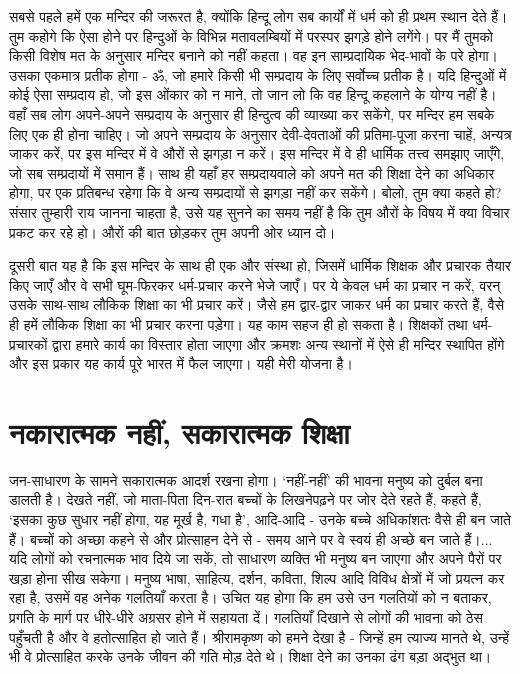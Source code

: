 
सबसे पहले हमें एक मन्दिर की जरूरत है, क्योंकि हिन्दू लोग सब कार्यों में धर्म को ही प्रथम स्थान देते हैं। तुम कहोगे कि ऐसा होने पर हिन्दुओं के विभिन्न मतावलम्बियों में परस्पर झगड़े होने लगेंगे। पर मैं तुमको किसी विशेष मत के अनुसार मन्दिर बनाने को नहीं कहता। वह इन साम्प्रदायिक भेद-भावों के परे होगा। उसका एकमात्र प्रतीक होगा - ॐ, जो हमारे किसी भी सम्प्रदाय के लिए सर्वोच्च प्रतीक है। यदि हिन्दुओं में कोई ऐसा सम्प्रदाय हो, जो इस ओंकार को न माने, तो जान लो कि वह हिन्दू कहलाने के योग्य नहीं है। वहाँ सब लोग अपने-अपने सम्प्रदाय के अनुसार ही हिन्दुत्व की व्याख्या कर सकेंगे, पर मन्दिर हम सबके लिए एक ही होना चाहिए। जो अपने सम्प्रदाय के अनुसार देवी-देवताओं की प्रतिमा-पूजा करना चाहें, अन्यत्र जाकर करें, पर इस मन्दिर में वे औरों से झगड़ा न करें। इस मन्दिर में वे ही धार्मिक तत्त्व समझाए जाएँगे, जो सब सम्प्रदायों में समान हैं। साथ ही यहाँ हर सम्प्रदायवाले को अपने मत की शिक्षा देने का अधिकार होगा, पर एक प्रतिबन्ध रहेगा कि वे अन्य सम्प्रदायों से झगड़ा नहीं कर सकेंगे। बोलो, तुम क्या कहते हो? संसार तुम्हारी राय जानना चाहता है, उसे यह सुनने का समय नहीं है कि तुम औरों के विषय में क्या विचार प्रकट कर रहे हो। औरों की बात छोड़कर तुम अपनी ओर ध्यान दो। 

दूसरी बात यह है कि इस मन्दिर के साथ ही एक और संस्था हो, जिसमें धार्मिक शिक्षक और प्रचारक तैयार किए जाएँ और वे सभी घूम-फिरकर धर्म-प्रचार करने भेजे जाएँ। पर ये केवल धर्म का प्रचार न करें, वरन् उसके साथ-साथ लौकिक शिक्षा का भी प्रचार करें। जैसे हम द्वार-द्वार जाकर धर्म का प्रचार करते हैं, वैसे ही हमें लौकिक शिक्षा का भी प्रचार करना पड़ेगा। यह काम सहज ही हो सकता है। शिक्षकों तथा धर्म-प्रचारकों द्वारा हमारे कार्य का विस्तार होता जाएगा और क्रमशः अन्य स्थानों में ऐसे ही मन्दिर स्थापित होंगे और इस प्रकार यह कार्य पूरे भारत में फैल जाएगा। यही मेरी योजना है।


\section*{नकारात्मक नहीं, सकारात्मक शिक्षा}


जन-साधारण के सामने सकारात्मक आदर्श रखना होगा। ‘नहीं-नहीं’ की भावना मनुष्य को दुर्बल बना डालती है। देखते नहीं, जो माता-पिता दिन-रात बच्चों के लिखनेपढ़ने पर जोर देते रहते हैं, कहते हैं, ‘इसका कुछ सुधार नहीं होगा, यह मूर्ख है, गधा है’, आदि-आदि - उनके बच्चे अधिकांशतः वैसे ही बन जाते हैं। बच्चों को अच्छा कहने से और प्रोत्साहन देने से - समय आने पर वे स्वयं ही अच्छे बन जाते हैं।... यदि लोगों को रचनात्मक भाव दिये जा सकें, तो साधारण व्यक्ति भी मनुष्य बन जाएगा और अपने पैरों पर खड़ा होना सीख सकेगा। मनुष्य भाषा, साहित्य, दर्शन, कविता, शिल्प आदि विविध क्षेत्रों में जो प्रयत्न कर रहा है, उसमें वह अनेक गलतियाँ करता है। उचित यह होगा कि हम उसे उन गलतियों को न बताकर, प्रगति के मार्ग पर धीरे-धीरे अग्रसर होने में सहायता दें। गलतियाँ दिखाने से लोगों की भावना को ठेस पहुँचती है और वे हतोत्साहित हो जाते हैं। श्रीरामकृष्ण को हमने देखा है - जिन्हें हम त्याज्य मानते थे, उन्हें भी वे प्रोत्साहित करके उनके जीवन की गति मोड़ देते थे। शिक्षा देने का उनका ढंग बड़ा अद्भुत था। 

